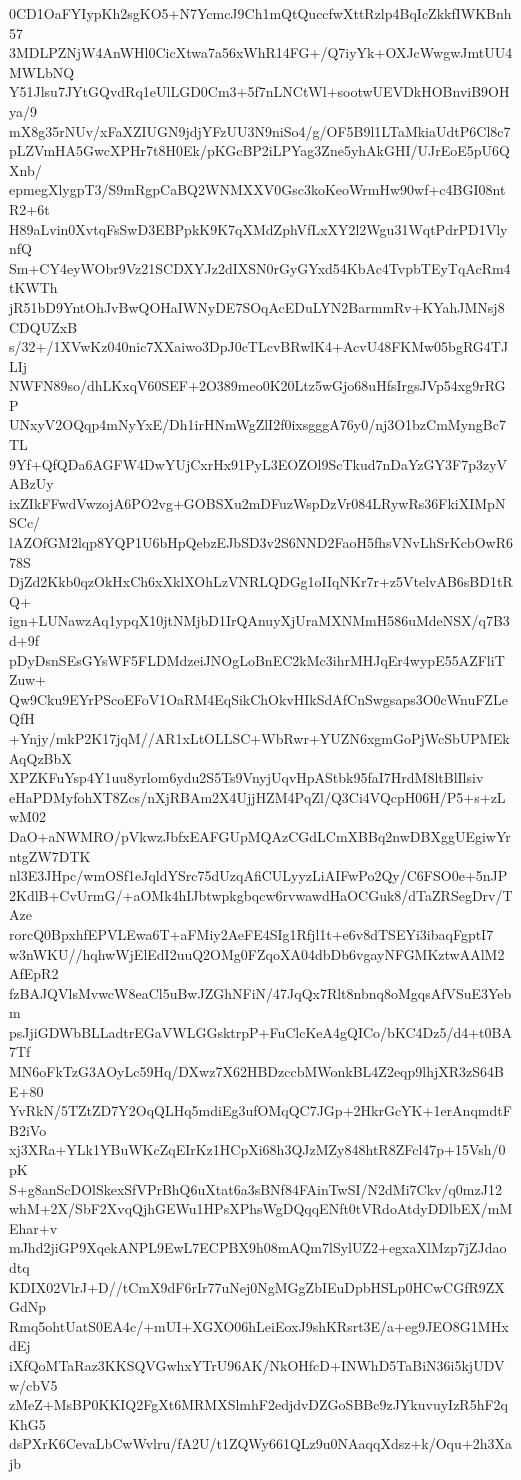 0CD1OaFYIypKh2sgKO5+N7YcmcJ9Ch1mQtQuccfwXttRzlp4BqIcZkkfIWKBnh57
3MDLPZNjW4AnWHl0CicXtwa7a56xWhR14FG+/Q7iyYk+OXJcWwgwJmtUU4MWLbNQ
Y51Jlsu7JYtGQvdRq1eUlLGD0Cm3+5f7nLNCtWl+sootwUEVDkHOBnviB9OHya/9
mX8g35rNUv/xFaXZIUGN9jdjYFzUU3N9niSo4/g/OF5B9l1LTaMkiaUdtP6Cl8c7
pLZVmHA5GwcXPHr7t8H0Ek/pKGcBP2iLPYag3Zne5yhAkGHI/UJrEoE5pU6QXnb/
epmegXlygpT3/S9mRgpCaBQ2WNMXXV0Gsc3koKeoWrmHw90wf+c4BGI08ntR2+6t
H89aLvin0XvtqFsSwD3EBPpkK9K7qXMdZphVfLxXY2l2Wgu31WqtPdrPD1VlynfQ
Sm+CY4eyWObr9Vz21SCDXYJz2dIXSN0rGyGYxd54KbAc4TvpbTEyTqAcRm4tKWTh
jR51bD9YntOhJvBwQOHaIWNyDE7SOqAcEDuLYN2BarmmRv+KYahJMNsj8CDQUZxB
s/32+/1XVwKz040nic7XXaiwo3DpJ0cTLcvBRwlK4+AcvU48FKMw05bgRG4TJLIj
NWFN89so/dhLKxqV60SEF+2O389meo0K20Ltz5wGjo68uHfsIrgsJVp54xg9rRGP
UNxyV2OQqp4mNyYxE/Dh1irHNmWgZlI2f0ixsgggA76y0/nj3O1bzCmMyngBc7TL
9Yf+QfQDa6AGFW4DwYUjCxrHx91PyL3EOZOl9ScTkud7nDaYzGY3F7p3zyVABzUy
ixZIkFFwdVwzojA6PO2vg+GOBSXu2mDFuzWspDzVr084LRywRs36FkiXIMpNSCc/
lAZOfGM2lqp8YQP1U6bHpQebzEJbSD3v2S6NND2FaoH5fhsVNvLhSrKcbOwR678S
DjZd2Kkb0qzOkHxCh6xXklXOhLzVNRLQDGg1oIIqNKr7r+z5VtelvAB6sBD1tRQ+
ign+LUNawzAq1ypqX10jtNMjbD1IrQAnuyXjUraMXNMmH586uMdeNSX/q7B3d+9f
pDyDsnSEsGYsWF5FLDMdzeiJNOgLoBnEC2kMc3ihrMHJqEr4wypE55AZFliTZuw+
Qw9Cku9EYrPScoEFoV1OaRM4EqSikChOkvHIkSdAfCnSwgsaps3O0cWnuFZLeQfH
+Ynjy/mkP2K17jqM//AR1xLtOLLSC+WbRwr+YUZN6xgmGoPjWcSbUPMEkAqQzBbX
XPZKFuYsp4Y1uu8yrlom6ydu2S5Ts9VnyjUqvHpAStbk95faI7HrdM8ltBlIlsiv
eHaPDMyfohXT8Zcs/nXjRBAm2X4UjjHZM4PqZl/Q3Ci4VQcpH06H/P5+s+zLwM02
DaO+aNWMRO/pVkwzJbfxEAFGUpMQAzCGdLCmXBBq2nwDBXggUEgiwYrntgZW7DTK
nl3E3JHpc/wmOSf1eJqldYSrc75dUzqAfiCULyyzLiAIFwPo2Qy/C6FSO0e+5nJP
2KdlB+CvUrmG/+aOMk4hIJbtwpkgbqcw6rvwawdHaOCGuk8/dTaZRSegDrv/TAze
rorcQ0BpxhfEPVLEwa6T+aFMiy2AeFE4SIg1Rfjl1t+e6v8dTSEYi3ibaqFgptI7
w3nWKU//hqhwWjElEdI2uuQ2OMg0FZqoXA04dbDb6vgayNFGMKztwAAlM2AfEpR2
fzBAJQVlsMvwcW8eaCl5uBwJZGhNFiN/47JqQx7Rlt8nbnq8oMgqsAfVSuE3Yebm
psJjiGDWbBLLadtrEGaVWLGGsktrpP+FuClcKeA4gQICo/bKC4Dz5/d4+t0BA7Tf
MN6oFkTzG3AOyLc59Hq/DXwz7X62HBDzccbMWonkBL4Z2eqp9lhjXR3zS64BE+80
YvRkN/5TZtZD7Y2OqQLHq5mdiEg3ufOMqQC7JGp+2HkrGcYK+1erAnqmdtFB2iVo
xj3XRa+YLk1YBuWKcZqEIrKz1HCpXi68h3QJzMZy848htR8ZFcl47p+15Vsh/0pK
S+g8anScDOlSkexSfVPrBhQ6uXtat6a3sBNf84FAinTwSI/N2dMi7Ckv/q0mzJ12
whM+2X/SbF2XvqQjhGEWu1HPsXPhsWgDQqqENft0tVRdoAtdyDDlbEX/mMEhar+v
mJhd2jiGP9XqekANPL9EwL7ECPBX9h08mAQm7lSylUZ2+egxaXlMzp7jZJdaodtq
KDIX02VlrJ+D//tCmX9dF6rIr77uNej0NgMGgZbIEuDpbHSLp0HCwCGfR9ZXGdNp
Rmq5ohtUatS0EA4c/+mUI+XGXO06hLeiEoxJ9shKRsrt3E/a+eg9JEO8G1MHxdEj
iXfQoMTaRaz3KKSQVGwhxYTrU96AK/NkOHfcD+INWhD5TaBiN36i5kjUDVw/cbV5
zMeZ+MsBP0KKIQ2FgXt6MRMXSlmhF2edjdvDZGoSBBc9zJYkuvuyIzR5hF2qKhG5
dsPXrK6CevaLbCwWvlru/fA2U/t1ZQWy661QLz9u0NAaqqXdsz+k/Oqu+2h3Xajb
